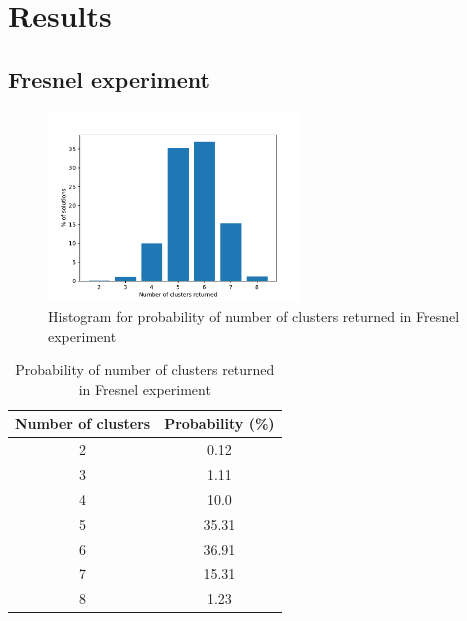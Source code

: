 \chapter{Results}

\section{Fresnel experiment}

\begin{figure}[ht!]
  \centering
  \includegraphics[width=0.6\textwidth]{figures/06results/num_clusters.pdf}
  \caption{Histogram for probability of number of clusters returned in Fresnel experiment}
\end{figure}

\begin{table}[ht]
  \centering
  \begin{tabular}{|c|c|}
      \hline
      Number of clusters & Probability (\%) \\
      \hline
      2 & 0.12 \\ 
      3 & 1.11 \\ 
      4 & 10.0 \\ 
      5 & 35.31 \\ 
      6 & 36.91 \\ 
      7 & 15.31 \\ 
      8 & 1.23 \\ 
      \hline
  \end{tabular}
  \caption{Probability of number of clusters returned in Fresnel experiment}
\end{table}